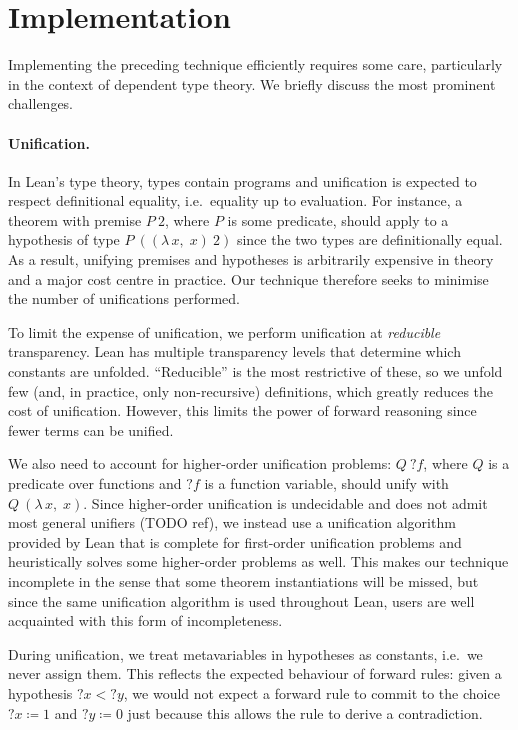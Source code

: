 \documentclass[runningheads]{llncs}
\newcommand{\Lam}[2]{\ensuremath{\lambda\, #1,\; #2}}
\newcommand{\mvar}[1]{\ensuremath{?#1}}
\begin{document}
\section{Implementation}%
\label{sec:implementation}

Implementing the preceding technique efficiently requires some care, particularly in the context of dependent type theory.
We briefly discuss the most prominent challenges.

\paragraph{Unification.}
In Lean's type theory, types contain programs and unification is expected to respect definitional equality, i.e.\ equality up to evaluation.
For instance, a theorem with premise $P~2$, where $P$ is some predicate, should apply to a hypothesis of type $P~((\Lam{x}{x})~2)$ since the two types are definitionally equal.
As a result, unifying premises and hypotheses is arbitrarily expensive in theory and a major cost centre in practice.
Our technique therefore seeks to minimise the number of unifications performed.

To limit the expense of unification, we perform unification at \emph{reducible} transparency.
Lean has multiple transparency levels that determine which constants are unfolded.
\enquote{Reducible} is the most restrictive of these, so we unfold few (and, in practice, only non-recursive) definitions, which greatly reduces the cost of unification.
However, this limits the power of forward reasoning since fewer terms can be unified.

We also need to account for higher-order unification problems: $Q~\mvar{f}$, where $Q$ is a predicate over functions and $\mvar{f}$ is a function variable, should unify with $Q~(\Lam{x}{x})$.
Since higher-order unification is undecidable and does not admit most general unifiers (TODO ref), we instead use a unification algorithm provided by Lean that is complete for first-order unification problems and heuristically solves some higher-order problems as well.
This makes our technique incomplete in the sense that some theorem instantiations will be missed, but since the same unification algorithm is used throughout Lean, users are well acquainted with this form of incompleteness.

During unification, we treat metavariables in hypotheses as constants, i.e.\ we never assign them.
This reflects the expected behaviour of forward rules: given a hypothesis $\mvar{x} < \mvar{y}$, we would not expect a forward rule to commit to the choice $\mvar{x} ≔ 1$ and $\mvar{y} ≔ 0$ just because this allows the rule to derive a contradiction.
\end{document}
